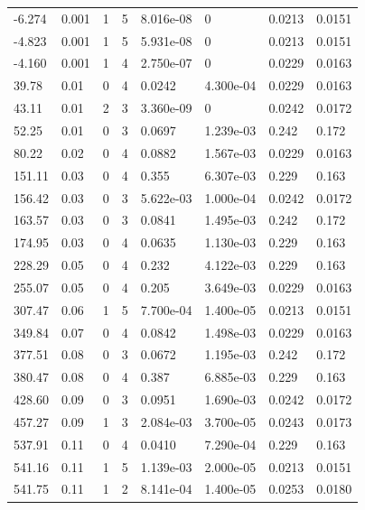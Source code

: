 \documentclass[preview]{standalone}
\begin{document}
{{\begin{tabular}{L{1.2cm}C{1.2cm} C{0.3cm}C{0.5cm} C{1.4cm}C{1.4cm} C{1.4cm}C{1.4cm}}
  -6.274  &  0.001  & 1     &  5 &  8.016e-08  & 0  & 0.0213 &  0.0151   \\ 
  -4.823  &  0.001  & 1     &  5 &  5.931e-08  & 0  & 0.0213 &  0.0151   \\ 
  -4.160  &  0.001  & 1     &  4 &  2.750e-07  & 0  & 0.0229 &  0.0163   \\ 
  39.78  &  0.01  & 0     &  4 &  0.0242  & 4.300e-04  & 0.0229 &  0.0163   \\ 
  43.11  &  0.01  & 2     &  3 &  3.360e-09  & 0  & 0.0242 &  0.0172   \\ 
  52.25  &  0.01  & 0     &  3 &  0.0697  & 1.239e-03  & 0.242 &  0.172   \\ 
  80.22  &  0.02  & 0     &  4 &  0.0882  & 1.567e-03  & 0.0229 &  0.0163   \\ 
  151.11  &  0.03  & 0     &  4 &  0.355  & 6.307e-03  & 0.229 &  0.163   \\ 
  156.42  &  0.03  & 0     &  3 &  5.622e-03  & 1.000e-04  & 0.0242 &  0.0172   \\ 
  163.57  &  0.03  & 0     &  3 &  0.0841  & 1.495e-03  & 0.242 &  0.172   \\ 
  174.95  &  0.03  & 0     &  4 &  0.0635  & 1.130e-03  & 0.229 &  0.163   \\ 
  228.29  &  0.05  & 0     &  4 &  0.232  & 4.122e-03  & 0.229 &  0.163   \\ 
  255.07  &  0.05  & 0     &  4 &  0.205  & 3.649e-03  & 0.0229 &  0.0163   \\ 
  307.47  &  0.06  & 1     &  5 &  7.700e-04  & 1.400e-05  & 0.0213 &  0.0151   \\ 
  349.84  &  0.07  & 0     &  4 &  0.0842  & 1.498e-03  & 0.0229 &  0.0163   \\ 
  377.51  &  0.08  & 0     &  3 &  0.0672  & 1.195e-03  & 0.242 &  0.172   \\ 
  380.47  &  0.08  & 0     &  4 &  0.387  & 6.885e-03  & 0.229 &  0.163   \\ 
  428.60  &  0.09  & 0     &  3 &  0.0951  & 1.690e-03  & 0.0242 &  0.0172   \\ 
  457.27  &  0.09  & 1     &  3 &  2.084e-03  & 3.700e-05  & 0.0243 &  0.0173   \\ 
  537.91  &  0.11  & 0     &  4 &  0.0410  & 7.290e-04  & 0.229 &  0.163   \\ 
  541.16  &  0.11  & 1     &  5 &  1.139e-03  & 2.000e-05  & 0.0213 &  0.0151   \\ 
  541.75  &  0.11  & 1     &  2 &  8.141e-04  & 1.400e-05  & 0.0253 &  0.0180   \\ 

\end{tabular}}}
\end{document}
